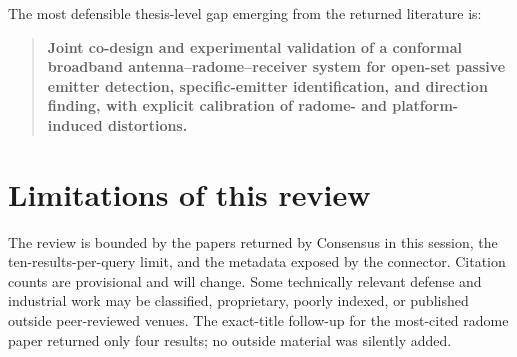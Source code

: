 \documentclass[
  10pt,
]{article}
\begin{document}
The most defensible thesis-level gap emerging from the returned
literature is:

\begin{quote}
\textbf{Joint co-design and experimental validation of a conformal
broadband antenna--radome--receiver system for open-set passive emitter
detection, specific-emitter identification, and direction finding, with
explicit calibration of radome- and platform-induced distortions.}
\end{quote}

\section{Limitations of this review}\label{limitations-of-this-review}

The review is bounded by the papers returned by Consensus in this
session, the ten-results-per-query limit, and the metadata exposed by
the connector. Citation counts are provisional and will change. Some
technically relevant defense and industrial work may be classified,
proprietary, poorly indexed, or published outside peer-reviewed venues.
The exact-title follow-up for the most-cited radome paper returned only
four results; no outside material was silently added.

\renewcommand\refname{References}
  
\end{document}

